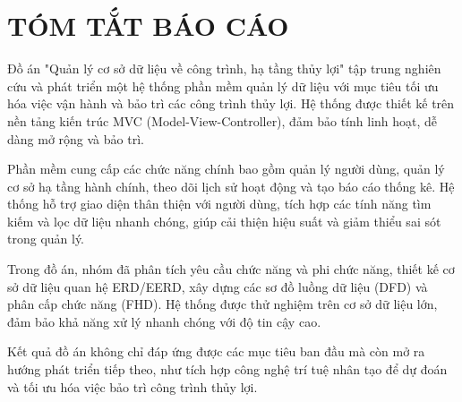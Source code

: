 \section*{TÓM TẮT BÁO CÁO}
Đồ án "Quản lý cơ sở dữ liệu về công trình,
hạ tầng thủy lợi" tập trung nghiên cứu và phát triển 
một hệ thống phần mềm quản lý dữ liệu với mục tiêu tối 
ưu hóa việc vận hành và bảo trì các công trình thủy lợi. 
Hệ thống được thiết kế trên nền tảng kiến trúc MVC (Model-View-Controller), 
đảm bảo tính linh hoạt, dễ dàng mở rộng và bảo trì.

Phần mềm cung cấp các chức năng chính bao gồm quản 
lý người dùng, quản lý cơ sở hạ tầng hành chính, 
theo dõi lịch sử hoạt động và tạo báo cáo thống kê.
 Hệ thống hỗ trợ giao diện thân thiện với người dùng, 
 tích hợp các tính năng tìm kiếm và lọc dữ liệu nhanh chóng, 
 giúp cải thiện hiệu suất và giảm thiểu sai sót trong quản lý.

Trong đồ án, nhóm đã phân tích yêu cầu chức năng và phi chức năng, 
thiết kế cơ sở dữ liệu quan hệ ERD/EERD, xây dựng các sơ đồ luồng dữ liệu 
(DFD) và phân cấp chức năng (FHD). Hệ thống được thử nghiệm 
trên cơ sở dữ liệu lớn, đảm bảo khả năng xử lý nhanh chóng 
với độ tin cậy cao.

Kết quả đồ án không chỉ đáp ứng được các 
mục tiêu ban đầu mà còn mở ra hướng phát triển tiếp theo, 
như tích hợp công nghệ trí tuệ nhân tạo để dự đoán và tối 
ưu hóa việc bảo trì công trình thủy lợi.
\cleardoublepage